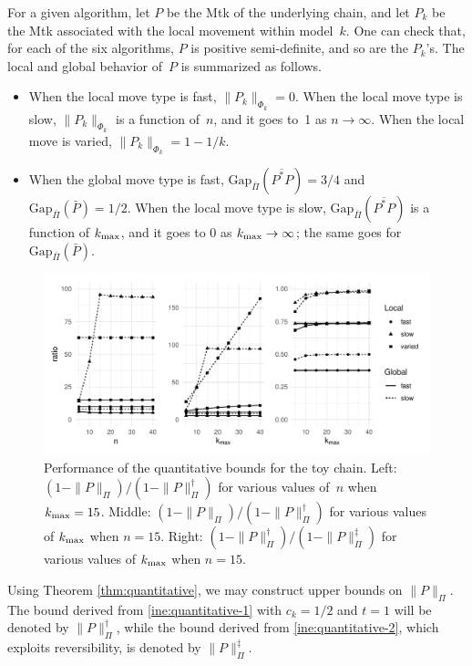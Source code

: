 \documentclass[12pt]{article}
\begin{document}
For a given algorithm, let $P$ be the Mtk of the underlying chain, and let $P_k$ be the Mtk associated with the local movement within model~$k$.
One can check that, for each of the six algorithms, $P$ is positive semi-definite, and so are the $P_k$'s.
The local and global behavior of~$P$ is summarized as follows.
\begin{itemize}
	\item When the local move type is fast, $\|P_k\|_{\Phi_k} = 0$.
	When the local move type is slow, $\|P_k\|_{\Phi_k}$ is a function of~$n$, and it goes to~1 as $n \to \infty$.
	When the local move is varied, $\|P_k\|_{\Phi_k} = 1-1/k$.
	\item When the global move type is fast, $\mbox{Gap}_{\bar{\Pi}}(\overline{P^*P}) = 3/4$ and $\mbox{Gap}_{\bar{\Pi}}(\bar{P}) = 1/2$.
	When the local move type is slow, $\mbox{Gap}_{\bar{\Pi}}(\overline{P^*P})$ is a function of $k_{\scriptsize\mbox{max}}$, and it goes to 0 as $k_{\scriptsize\mbox{max}} \to \infty$; the same goes for $\mbox{Gap}_{\bar{\Pi}}(\bar{P})$.
\end{itemize}


\begin{figure}
	\begin{center}
		\includegraphics[width=\textwidth]{numeric}
		\caption{Performance of the quantitative bounds for the toy chain.
		Left: $(1-\|P\|_{\Pi})/(1-\|P\|_{\Pi}^{\dagger})$ for various values of~$n$ when $k_{\scriptsize\mbox{max}} = 15$.
		Middle: $(1-\|P\|_{\Pi})/(1-\|P\|_{\Pi}^{\dagger})$ for various values of $k_{\scriptsize\mbox{max}}$ when $n = 15$.
		Right: $(1-\|P\|_{\Pi}^{\dagger})/(1-\|P\|_{\Pi}^{\ddagger})$ for various values of $k_{\scriptsize\mbox{max}}$ when $n = 15$.
		} \label{fig:numeric}
	\end{center}
\end{figure}

Using Theorem \ref{thm:quantitative}, we may construct upper bounds on $\|P\|_{\Pi}$.
The bound derived from \eqref{ine:quantitative-1} with $c_k = 1/2$ and $t=1$ will be denoted by $\|P\|_{\Pi}^{\dagger}$, while the bound derived from \eqref{ine:quantitative-2}, which exploits reversibility, is denoted by $\|P\|_{\Pi}^{\ddagger}$.
\end{document}
